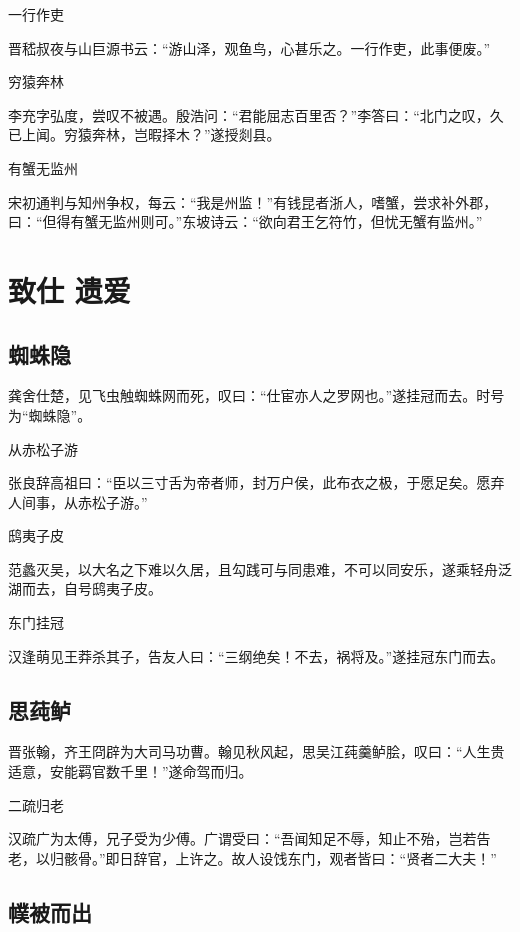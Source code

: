 \documentclass[a4paper,12pt,UTF8,twoside]{ctexbook}
\begin{document}
    一行作吏
    
    晋嵇叔夜与山巨源书云：“游山泽，观鱼鸟，心甚乐之。一行作吏，此事便废。”
    
    穷猿奔林
    
    李充字弘度，尝叹不被遇。殷浩问：“君能屈志百里否？”李答曰：“北门之叹，久已上闻。穷猿奔林，岂暇择木？”遂授剡县。
    
    有蟹无监州
    
    宋初通判与知州争权，每云：“我是州监！”有钱昆者浙人，嗜蟹，尝求补外郡，曰：“但得有蟹无监州则可。”东坡诗云：“欲向君王乞符竹，但忧无蟹有监州。”
    
    \chapter{致仕 遗爱}
    
    \section{蜘蛛隐}
    
    龚舍仕楚，见飞虫触蜘蛛网而死，叹曰：“仕宦亦人之罗网也。”遂挂冠而去。时号为“蜘蛛隐”。
    
    从赤松子游
    
    张良辞高祖曰：“臣以三寸舌为帝者师，封万户侯，此布衣之极，于愿足矣。愿弃人间事，从赤松子游。”
    
    鸱夷子皮
    
    范蠡灭吴，以大名之下难以久居，且勾践可与同患难，不可以同安乐，遂乘轻舟泛湖而去，自号鸱夷子皮。
    
    东门挂冠
    
    汉逢萌见王莽杀其子，告友人曰：“三纲绝矣！不去，祸将及。”遂挂冠东门而去。
    
    \section{思莼鲈}
    
    晋张翰，齐王冏辟为大司马功曹。翰见秋风起，思吴江莼羹鲈脍，叹曰：“人生贵适意，安能羁官数千里！”遂命驾而归。
    
    二疏归老
    
    汉疏广为太傅，兄子受为少傅。广谓受曰：“吾闻知足不辱，知止不殆，岂若告老，以归骸骨。”即日辞官，上许之。故人设饯东门，观者皆曰：“贤者二大夫！”
    
    \section{幞被而出}
    
\end{document}
